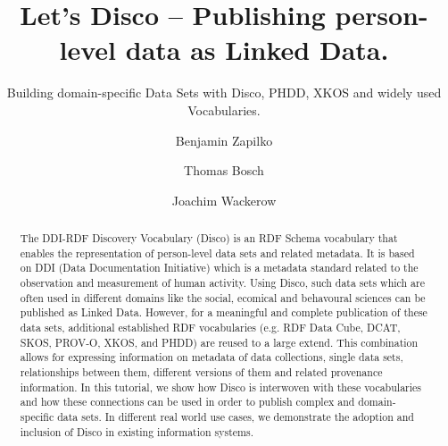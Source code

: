 \documentclass{llncs}
\begin{document}
%
%
\title{Let’s Disco – Publishing person-level data as Linked Data.}
\subtitle{Building domain-specific Data Sets with Disco, PHDD, XKOS and widely used Vocabularies.
}
%
%
\author{Benjamin Zapilko \and Thomas Bosch \and Joachim Wackerow}
%
%

\maketitle              %

\begin{abstract}
The DDI-RDF Discovery Vocabulary (Disco) is an RDF Schema vocabulary that enables the representation of person-level data sets and related metadata.
It is based on DDI (Data Documentation Initiative) which is a metadata standard related to the observation and measurement of human activity.
Using Disco, such data sets which are often used in different domains like the social, ecomical and behavoural sciences can be published as Linked Data. 
However, for a meaningful and complete publication of these data sets, additional established RDF vocabularies (e.g. RDF Data Cube, DCAT, SKOS, PROV-O, XKOS, and PHDD) are reused to a large extend. 
This combination allows for expressing information on metadata of data collections, single data sets, relationships between them, different versions of them and related provenance information. 
In this tutorial, we show how Disco is interwoven with these vocabularies and how these connections can be used in order to publish complex and domain-specific data sets.
In different real world use cases, we demonstrate the adoption and inclusion of Disco in existing information systems. 

 

\end{abstract}
%
\end{document}
